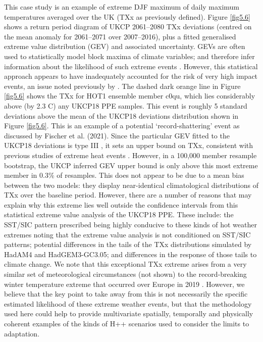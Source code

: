     This case study is an example of extreme DJF maximum of daily maximum temperatures averaged over the UK (TXx as previously defined). Figure \ref{fig5.6} shows a return period diagram of UKCP 2061--2080 TXx deviations (centred on the mean anomaly for 2061--2071 over 2007--2016), plus a fitted generalised extreme value distribution (GEV) and associated uncertainty. GEVs are often used to statistically model block maxima of climate variables; and therefore infer information about the likelihood of such extreme events \citep{brown_climate_2014}. However, this statistical approach appears to have inadequately accounted for the risk of very high impact events, an issue noted previously by \citet{sippel_combining_2015}. The dashed dark orange line in Figure \ref{fig5.6} shows the TXx for HOT1 ensemble member c0qu, which lies considerably above (by 2.3 \textdegree{}C) any UKCP18 PPE samples. This event is roughly 5 standard deviations above the mean of the UKCP18 deviations distribution shown in Figure \ref{fig5.6}. This is an example of a potential `record-shattering' event as discussed by Fischer et al. (2021). Since the particular GEV fitted to the UKCP18 deviations is type III \citep{coles_introduction_2001}, it sets an upper bound on TXx, consistent with previous studies of extreme heat events \citep{gessner_very_2021}. However, in a 100,000 member resample bootstrap, the UKCP inferred GEV upper bound is only above this most extreme member in 0.3\% of resamples. This does not appear to be due to a mean bias between the two models: they display near-identical climatological distributions of TXx over the baseline period. However, there are a number of reasons that may explain why this extreme lies well outside the confidence intervals from this statistical extreme value analysis of the UKCP18 PPE. These include: the SST/SIC pattern prescribed being highly conducive to these kinds of hot weather extremes noting that the extreme value analysis is not conditioned on SST/SIC patterns; potential differences in the tails of the TXx distributions simulated by HadAM4 and HadGEM3-GC3.05; and differences in the response of those tails to climate change. We note that this exceptional TXx extreme arises from a very similar set of meteorological circumstances (not shown) to the record-breaking winter temperature extreme that occurred over Europe in 2019 \citep{kendon_temperature_2020,young_record-breaking_2020}. However, we believe that the key point to take away from this is not necessarily the specific estimated likelihood of these extreme weather events, but that the methodology used here could help to provide multivariate spatially, temporally and physically coherent examples of the kinds of H++ scenarios used to consider the limits to adaptation.

